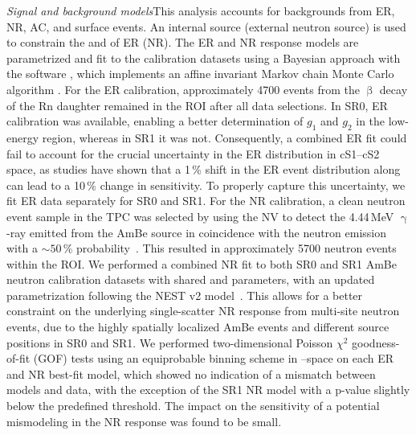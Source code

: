 \documentclass[
    reprint,
    superscriptaddress,
    aps, prl,
    amsmath,amssymb,
    twocolumn,
    showkeys,
    floatfix,
    nofootinbib,
]{revtex4-2}
\begin{document}
\textit{Signal and background models\textemdash}This analysis accounts for backgrounds from ER, NR, AC, and surface events.
An internal  source (external  neutron source) is used to constrain the \lightyield and \chargeyield of ER (NR).
The ER and NR response models are parametrized and fit to the calibration datasets using a Bayesian approach \cite{XENON:2024ap2} with the software  \cite{appletree}, which implements an affine invariant Markov chain Monte Carlo algorithm \cite{emcee}. 
For the ER calibration, approximately 4700 events from the $\upbeta$ decay of the Rn daughter  remained in the ROI after all data selections.
In SR0,  ER calibration was available, enabling a better determination of $g_1$ and $g_2$ in the low-energy region, whereas in SR1 it was not.
Consequently, a combined ER fit could fail to account for the crucial uncertainty in the ER distribution in cS1--cS2 space, as \toymc studies have shown that a 1\,\% shift in the ER event distribution along \cstwo can lead to a 10\,\% change in sensitivity.
To properly capture this uncertainty, we fit ER data separately for SR0 and SR1.
For the NR calibration, a clean neutron event sample in the TPC was selected by using the NV to detect the 4.44\,MeV $\upgamma$-ray emitted from the AmBe source in coincidence with the neutron emission with a $\sim50$\,\% probability~\cite{danielwphd}.
This resulted in approximately 5700 neutron events within the ROI.
We performed a combined NR fit to both SR0 and SR1 AmBe neutron calibration datasets with shared \lightyield and \chargeyield parameters, with an updated parametrization following the NEST v2 model~\cite{Szydagis:2025}.
This allows for a better constraint on the underlying single-scatter NR response from multi-site neutron events, due to the highly spatially localized AmBe events and different source positions in SR0 and SR1.
We performed two-dimensional Poisson $\chi^2$ goodness-of-fit (GOF) tests using an equiprobable binning scheme in \csone--\cstwo space on each ER and NR best-fit model, which showed no indication of a mismatch between models and data, with the exception of the SR1 NR model with a p-value slightly below the predefined threshold.
The impact on the sensitivity of a potential mismodeling in the NR response was found to be small.
\end{document}
